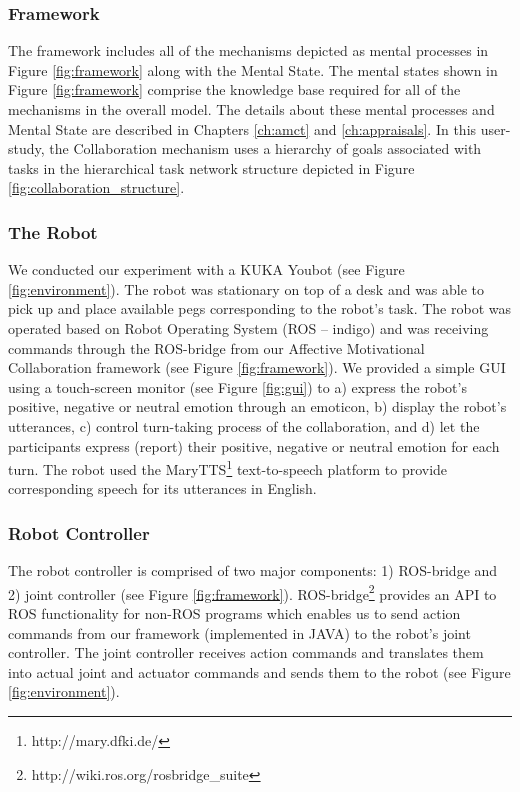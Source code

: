\documentclass[12pt]{report}
\begin{document}
\subsubsection{Framework}
\label{sec:theory}
The framework includes all of the mechanisms depicted as mental processes in
Figure \ref{fig:framework} along with the Mental State. The mental
states shown in Figure \ref{fig:framework} comprise the knowledge base required
for all of the mechanisms in the overall model. The details about these mental
processes and Mental State are described in Chapters \ref{ch:amct} and
\ref{ch:appraisals}. In this user-study, the Collaboration mechanism uses a
hierarchy of goals associated with tasks in the hierarchical task network
structure depicted in Figure \ref{fig:collaboration_structure}.

\subsubsection{The Robot}

We conducted our experiment with a KUKA Youbot (see Figure
\ref{fig:environment}). The robot was stationary on top of a desk and was able
to pick up and place available pegs corresponding to the robot's task. The robot
was operated based on Robot Operating System (ROS -- indigo) and was receiving
commands through the ROS-bridge from our Affective Motivational Collaboration
framework (see Figure \ref{fig:framework}). We provided a simple GUI using a
touch-screen monitor (see Figure \ref{fig:gui}) to a) express the robot's
positive, negative or neutral emotion through an emoticon, b) display the
robot's utterances, c) control turn-taking process of the collaboration, and d)
let the participants express (report) their positive, negative or neutral
emotion for each turn. The robot used the MaryTTS\footnote{http://mary.dfki.de/}
text-to-speech platform to provide corresponding speech for its utterances in
English.

\subsubsection{Robot Controller}
The robot controller is comprised of two major components: 1) ROS-bridge and 2)
joint controller (see Figure \ref{fig:framework}).
ROS-bridge\footnote{http://wiki.ros.org/rosbridge\_suite} provides an API to ROS
functionality for non-ROS programs which enables us to send action commands from
our framework (implemented in JAVA) to the robot's joint controller. The joint
controller receives action commands and translates them into actual joint and
actuator commands and sends them to the robot (see Figure \ref{fig:environment}).
\end{document}
